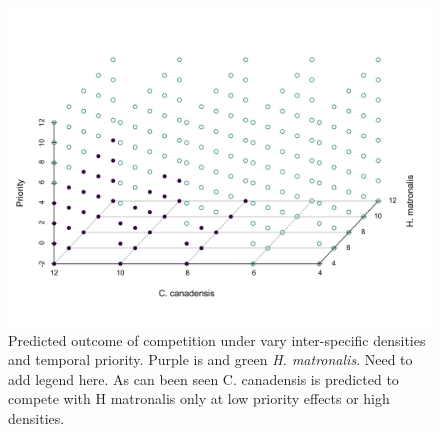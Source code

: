 \documentclass{article}\usepackage[]{graphicx}\usepackage[]{color}
\begin{document}
\begin{figure}[h!]
    \centering
\includegraphics[width=\textwidth]{..//figure/threedpred.jpeg}
    \caption{Predicted outcome of competition under vary inter-specific densities and temporal priority. Purple is  and green \textit{H. matronalis}. Need to add legend here. As can been seen C. canadensis is predicted to compete with H matronalis only at low priority effects or high densities. } 
    \label{fig:Hm}
\end{figure}



\end{document}
